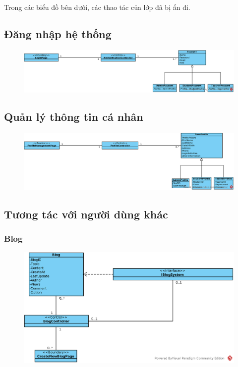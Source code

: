 \documentclass[./../main_file.tex]{subfiles}
\begin{document}
Trong các biểu đồ bên dưới, các thao tác của lớp đã bị ẩn đi.

\subsection{Đăng nhập hệ thống}
\begin{figure}[H]
	\centering
	\includegraphics[width=\linewidth]{./images/define_attribute/ucd_atr_ss_login.eps}
\end{figure}
\subsection{Quản lý thông tin cá nhân}
\begin{figure}[H]
	\centering
	\includegraphics[width=\linewidth]{./images/define_attribute/ucd_atr_ss_profile.eps}
\end{figure}
\subsection{Tương tác với người dùng khác}
\subsubsection{Blog}
\begin{figure}[H]
	\centering
	\includegraphics[width=\linewidth]{./images/define_attribute/ucd_atr_ss_blog.eps}
\end{figure}
\end{document}
